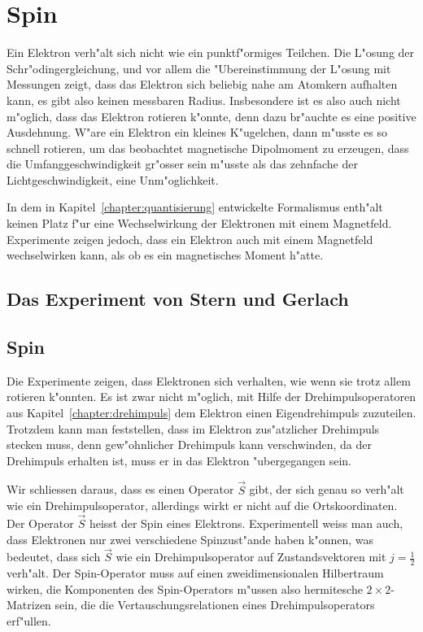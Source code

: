 \chapter{Spin\label{chapter:spin}}
\rhead{}
Ein Elektron verh"alt sich nicht wie ein punktf"ormiges Teilchen.
Die L"osung der Schr"odingergleichung, und vor allem die "Ubereinstimmung
der L"osung mit Messungen zeigt, dass das Elektron sich beliebig nahe 
am Atomkern aufhalten kann, es gibt also keinen messbaren Radius.
Insbesondere ist es also auch nicht m"oglich, dass das Elektron
rotieren k"onnte, denn dazu br"auchte es eine positive Ausdehnung.
W"are ein Elektron ein kleines K"ugelchen, dann m"usste es so schnell
rotieren, um das beobachtet magnetische Dipolmoment zu erzeugen, dass
die Umfanggeschwindigkeit gr"osser sein m"usste als das zehnfache
der Lichtgeschwindigkeit, eine Unm"oglichkeit.

In dem in Kapitel~\ref{chapter:quantisierung} entwickelte Formalismus
enth"alt keinen Platz f"ur eine Wechselwirkung der Elektronen
mit einem Magnetfeld.
Experimente zeigen jedoch, dass ein Elektron auch mit einem Magnetfeld
wechselwirken kann, als ob es ein magnetisches Moment h"atte. 

\section{Das Experiment von Stern und Gerlach}

%
%
\section{Spin}
Die Experimente zeigen, dass Elektronen sich verhalten, wie wenn sie
trotz allem rotieren k"onnten.
Es ist zwar nicht m"oglich, mit Hilfe der Drehimpulsoperatoren
aus Kapitel~\ref{chapter:drehimpuls}
dem Elektron einen Eigendrehimpuls zuzuteilen.
Trotzdem kann man feststellen, dass im Elektron zus"atzlicher
Drehimpuls stecken muss, denn gew"ohnlicher Drehimpuls kann verschwinden,
da der Drehimpuls erhalten ist, muss er in das Elektron "ubergegangen
sein.

Wir schliessen daraus, dass es einen Operator $\vec S$ gibt, der sich
genau so verh"alt wie ein Drehimpulsoperator, allerdings wirkt er nicht
auf die Ortskoordinaten.
Der Operator $\vec S$ heisst der Spin eines Elektrons.
Experimentell weiss man auch, dass Elektronen nur zwei verschiedene
Spinzust"ande haben k"onnen, was bedeutet, dass sich $\vec S$ wie ein
Drehimpulsoperator auf Zustandsvektoren mit $j=\frac12$ verh"alt.
Der Spin-Operator muss auf einen zweidimensionalen Hilbertraum
wirken, die Komponenten des Spin-Operators m"ussen also hermitesche
$2\times 2$-Matrizen sein, die die Vertauschungsrelationen eines
Drehimpulsoperators erf"ullen.

